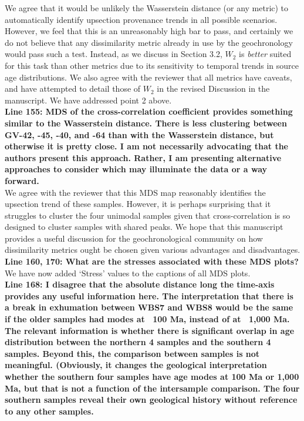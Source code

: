 \documentclass{article}[12p,a4paper]
\begin{document}
We agree that it would be unlikely the Wasserstein distance (or any metric) to automatically identify upsection provenance trends in all possible scenarios. However, we feel that this is an unreasonably high bar to pass, and certainly we do not believe that any dissimilarity metric already in use by the geochronology would pass such a test. Instead, as we discuss in Section 3.2, $W_2$ is \textit{better} suited for this task than other metrics due to its sensitivity to temporal trends in source age distributions. We also agree with the reviewer that all metrics have caveats, and have attempted to detail those of $W_2$ in the revised Discussion in the manuscript. We have addressed point 2 above. \\

\textbf{Line 155: MDS of the cross-correlation coefficient provides something similar to the Wasserstein distance. There is less clustering between GV-42, -45, -40, and -64 than with the Wasserstein distance, but otherwise it is pretty close. I am not necessarily advocating that the authors present this approach. Rather, I am presenting alternative approaches to consider which may illuminate the data or a way forward.}\\

We agree with the reviewer that this MDS map reasonably identifies the upsection trend of these samples. However, it is perhaps surprising that it struggles to cluster the four unimodal samples given that cross-correlation is so designed to cluster samples with shared peaks. We hope that this manuscript provides a useful discussion for the geochronological community on how dissimilarity metrics ought be chosen given various advantages and disadvantages.\\  

\textbf{Line 160, 170: What are the stresses associated with these MDS plots?}\\ 

We have now added `Stress' values to the captions of all MDS plots.\\ 

\textbf{Line 168: I disagree that the absolute distance long the time-axis provides any useful information here. The interpretation that there is a break in exhumation between WBS7 and WBS8 would be the same if the older samples had modes at ~100 Ma, instead of at ~1,000 Ma. The relevant information is whether there is significant overlap in age distribution between the northern 4 samples and the southern 4 samples. Beyond this, the comparison between samples is not meaningful. (Obviously, it changes the geological interpretation whether the southern four samples have age modes at 100 Ma or 1,000 Ma, but that is not a function of the intersample comparison. The four southern samples reveal their own geological history without reference to any other samples.}\\
\end{document}
